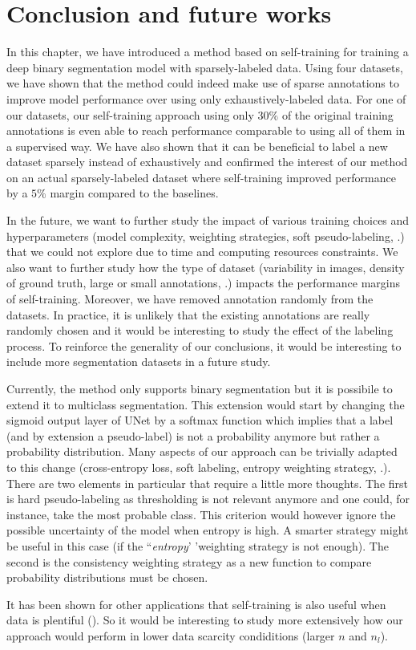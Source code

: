\section{Conclusion and future works}
\label{sec:strain:conclusion}

In this chapter, we have introduced a method based on self-training for training a deep binary segmentation model with sparsely-labeled data. Using four datasets, we have shown that the method could indeed make use of sparse annotations to improve model performance over using only exhaustively-labeled data. For one of our datasets, our self-training approach using only $30\%$ of the original training annotations is even able to reach performance comparable to using all of them in a supervised way. We have also shown that it can be beneficial to label a new dataset sparsely instead of exhaustively and confirmed the interest of our method on an actual sparsely-labeled dataset where self-training improved performance by a $5\%$ margin compared to the baselines. 

In the future, we want to further study the impact of various training choices and hyperparameters (model complexity, weighting strategies, soft pseudo-labeling, \etc.) that we could not explore due to time and computing resources constraints. We also want to further study how the type of dataset (variability in images, density of ground truth, large or small annotations, \etc.) impacts the performance margins of self-training. Moreover, we have removed annotation randomly from the datasets. In practice, it is unlikely that the existing annotations are really randomly chosen and it would be interesting to study the effect of the labeling process. To reinforce the generality of our conclusions, it would be interesting to include more segmentation datasets in a future study.

Currently, the method only supports binary segmentation but it is possibile to extend it to multiclass segmentation. This extension would start by changing the sigmoid output layer of UNet by a softmax function which implies that a label (and by extension a pseudo-label) is not a probability anymore but rather a probability distribution. Many aspects of our approach can be trivially adapted to this change (cross-entropy loss, soft labeling, entropy weighting strategy, \etc.). There are two elements in particular that require a little more thoughts. The first is hard pseudo-labeling as thresholding is not relevant anymore and one could, for instance, take the most probable class. This criterion would however ignore the possible uncertainty of the model when entropy is high. A smarter strategy might be useful in this case (if the ``\textit{entropy}' 'weighting strategy is not enough). The second is the consistency weighting strategy as a new function to compare probability distributions must be chosen. 

It has been shown for other applications that self-training is also useful when data is plentiful (\eg \cite{zoph2020rethinking}). So it would be interesting to study more extensively how our approach would perform in lower data scarcity condiditions (\eg larger $n$ and $n_l$).